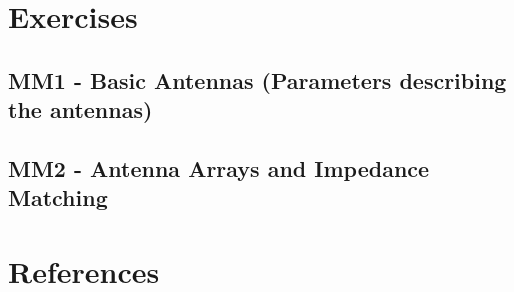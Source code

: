 



    \singlespacing
    \pagestyle{empty}	
	
	\cleardoublepage
	
	\pagestyle{plain}
		
	\tableofcontents 
	\onehalfspacing
	\pagestyle{fancy} %
    \setcounter{page}{0} %

\part{Exercises}

\chapter{MM1 - Basic Antennas (Parameters describing the antennas)}





\chapter{MM2 - Antenna Arrays and Impedance Matching}







\part{References}







